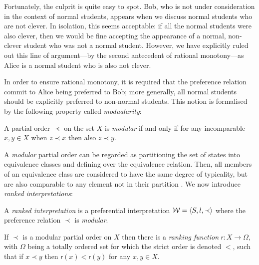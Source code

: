 %
Fortunately, the culprit is quite easy to spot. Bob, who is not under consideration in the context of normal students, appears
when we discuss normal students who are not clever. In isolation, this seems acceptable: if all the normal students were
also clever, then we would be fine accepting the appearance of a normal, non-clever student who was not a normal student.
However, we have explicitly ruled out this line of argument---by the second antecedent of rational monotony---as Alice
is a normal student who is also not clever.

In order to ensure rational monotony, it is required that the preference relation commit to Alice being preferred to Bob;
more generally, all normal students should be explicitly preferred to non-normal students. This notion is formalised by
the following property called \textit{modualarity}:

\begin{definition}
	\label{definition:modular-order} 

	A partial order $\prec$ on the set $X$ is \emph{modular} if and only if for any incomparable $x,y \in X$ when $z \prec
	x$ then also $z \prec y$.
\end{definition}

A \textit{modular} partial order can be regarded as partitioning the set of states into equivalence classes and defining
over the equivalence relation. Then, all members of an equivalence class are considered to have the same degree of typicality,
but are also comparable to any element not in their partition \cite{GinsberCounterfactuals}. We now introduce \textit{ranked
interpretations}:

\begin{definition}
	\label{definition:ranked-interpretation}

	A \emph{ranked interpretation} is a preferential interpretation $\mathcal{W} = \langle S,l,\prec \rangle$ where the preference relation $\prec$ is \emph{modular}.
\end{definition}

\begin{lemma}
	\label{lemma:modular-ranking-function}

	If $\prec$ is a modular partial order on $X$ then there is a \emph{ranking function} $\mathsf{r}\colon X \to \Omega$,
	with $\Omega$ being a totally ordered set for which the strict order is denoted $<$, such that if $x \prec y$ then $\mathsf{r}
	(x) < \mathsf{r}(y)$ for any $x,y \in X$.
\end{lemma}

